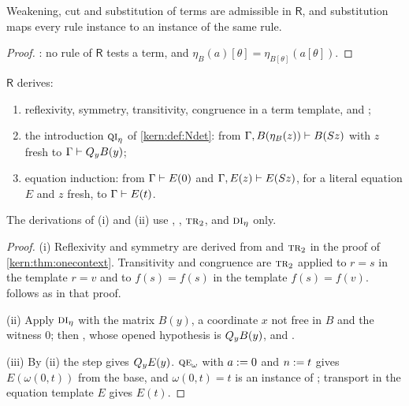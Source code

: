 \begin{lemma}
\label{kern:lem:rstruct}
Weakening, cut and substitution of terms are admissible in $\mathsf{R}$, and
substitution maps every rule instance to an instance of the same rule.
\end{lemma}

\begin{proof}
: no rule of $\mathsf{R}$ tests a term, and
$\eta_B(a)[\theta]=\eta_{B[\theta]}(a[\theta])$.
\end{proof}

\begin{lemma}
\label{kern:lem:rbasic}
$\mathsf{R}$ derives:
\begin{enumerate}[label=\textup{(\roman*)}]
\item reflexivity, symmetry, transitivity, congruence in a term template,
 and ;
\item the introduction $\rulename{QI}_{\eta}$ of \cref{kern:def:Ndet}: from
 $\Gamma,B(\eta_B(z))\vdash B(S z)$ with $z$ fresh to
 $\Gamma\vdash Q_{y}B(y)$;
\item equation induction: from $\Gamma\vdash E(0)$ and
 $\Gamma,E(z)\vdash E(S z)$, for a literal equation $E$ and $z$ fresh,
 to $\Gamma\vdash E(t)$.
\end{enumerate}
The derivations of (i) and (ii) use , ,
$\rulename{Tr}_{2}$,  and $\rulename{DI}_{\eta}$ only.
\end{lemma}

\begin{proof}
(i) Reflexivity and symmetry are derived from  and
$\rulename{Tr}_{2}$ in the proof of \cref{kern:thm:onecontext}.
Transitivity and congruence are $\rulename{Tr}_{2}$ applied to $r=s$ in the
template $r=v$ and to $f(s)=f(s)$ in the template $f(s)=f(v)$.
 follows as in that proof.

(ii) Apply $\rulename{DI}_{\eta}$ with the matrix $B(y)$, a coordinate $x$
not free in $B$ and the witness $0$; then , whose opened
hypothesis is $Q_{y}B(y)$, and .

(iii) By (ii) the step gives $Q_{y}E(y)$.  $\rulename{QE}_{\omega}$ with
$a\mathrel{:=} 0$ and $n\mathrel{:=} t$ gives $E(\omega(0,t))$ from the base, and
$\omega(0,t)=t$ is an instance of ; transport in the equation
template $E$ gives $E(t)$.
\end{proof}

